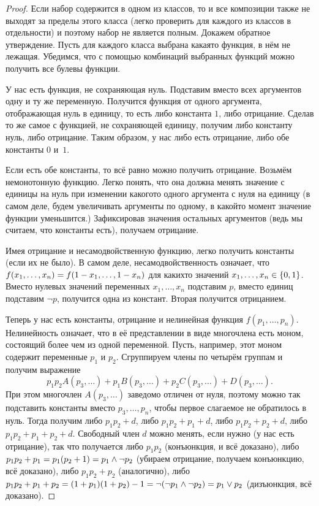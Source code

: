 \begin{proof}
Если набор содержится в одном из классов, то и все композиции
также не выходят за пределы этого класса (легко проверить для
каждого из классов в отдельности) и поэтому набор не является
полным. Докажем обратное утверждение. Пусть для каждого класса
выбрана какая\д то функция, в нём не лежащая. Убедимся, что с
помощью комбинаций выбранных функций можно получить все булевы
функции.

У нас есть функция, не сохраняющая нуль. Подставим вместо всех
аргументов одну и ту же переменную. Получится функция от одного
аргумента, отображающая нуль в единицу, то есть либо константа
$1$, либо отрицание. Сделав то же самое с функцией, не
сохраняющей единицу, получим либо константу нуль, либо
отрицание. Таким образом, у нас либо есть отрицание, либо обе
константы $0$ и~$1$.

Если есть обе константы, то всё равно можно получить отрицание.
Возьмём немонотонную функцию. Легко понять, что она должна
менять значение с единицы на нуль при изменении какого\д то
одного аргумента с нуля на единицу (в самом деле, будем
увеличивать аргументы по одному, в какой\д то момент значение
функции уменьшится.)  Зафиксировав значения остальных аргументов
(ведь мы считаем, что константы есть), получаем отрицание.

Имея отрицание и несамодвойственную функцию, легко получить
константы (если их не было). В самом деле, несамодвойственность
означает, что $f(x_1,\dots,x_n)\hm=f(1\hm-x_1,\dots,1\hm-x_n)$
для каких\д то значений $x_1,\dots,x_n\hm\in\{0,1\}$. Вместо
нулевых значений переменных $x_1,\dots,x_n$ подставим $p$,
вместо единиц подставим $\lnot p$, получится одна из констант.
Вторая получится отрицанием.

Теперь у нас есть константы, отрицание и нелинейная функция
$f(p_1,\dots,p_n)$. Нелинейность означает, что в её
представлении в виде многочлена есть моном, состоящий более чем из
одной переменной. Пусть, например,
этот моном содержит переменные $p_1$ и
$p_2$. Сгруппируем члены по четырём группам и получим выражение
        $$
p_1p_2 A(p_3,\dots)+p_1B(p_3,\dots)+p_2C(p_3,\dots)+D(p_3,\dots).
        $$
При этом многочлен $A(p_3,\dots)$ заведомо отличен от нуля, поэтому
можно так подставить константы вместо $p_3,\dots,p_n$, чтобы
первое слагаемое не обратилось в нуль. Тогда получим либо
$p_1p_2+d$, либо $p_1p_2 + p_1+d$, либо $p_1p_2+p_2+d$, либо
$p_1p_2+p_1+p_2+d$. Свободный член $d$ можно менять, если нужно
(у нас есть отрицание), так что получается либо $p_1p_2$
(конъюнкция, и всё доказано), либо $p_1p_2+p_1\hm=p_1(p_2+1)\hm=
p_1\land\lnot p_2$ (убираем отрицание, получаем конъюнкцию, всё
доказано), либо $p_1p_2+p_2$ (аналогично), либо
$p_1p_2+p_1+p_2\hm= (1+p_1)(1+p_2)-1\hm=\lnot(\lnot p_1\land\lnot
p_2)\hm=p_1\lor p_2$ (дизъюнкция, всё доказано).
\end{proof}

